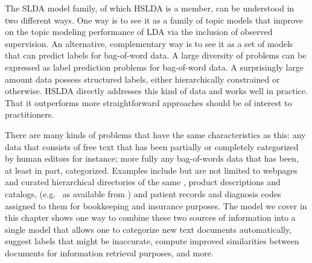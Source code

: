The SLDA model family, of which HSLDA is a member, can be understood in two
different ways. One way is to see it as a family of topic models that improve
on the topic modeling performance of LDA via the inclusion of observed
supervision. An alternative, complementary way is to see it as a set of models
that can predict labels for bag-of-word data. A large diversity of problems
can be expressed as label prediction problems for bag-of-word data. A
surprisingly large amount data possess structured labels,
either hierarchically constrained or otherwise.  HSLDA directly addresses
this kind of data and works well in practice. That it
outperforms more straightforward approaches should be of interest to
practitioners.
%
%

There are many kinds of problems that have the same characteristics as this: any data  that consists of free text that has been partially or
completely categorized by human editors for instance; more fully
any bag-of-words data that has been, at least in part, 
categorized. 
 Examples include but are not limited to webpages and curated
hierarchical directories of the same \cite{DMOZ}, product descriptions and
catalogs, (e.g.~\cite{AMAZON} as available from \cite{SNAP})
and patient records %
and diagnosis codes assigned to them for bookkeeping and insurance purposes.
The model we cover in this chapter shows one way to combine 
these two sources of information into a single model that allows one to
categorize new text documents automatically, suggest labels that might be
inaccurate, compute improved similarities between documents for information
retrieval purposes, and more. %

